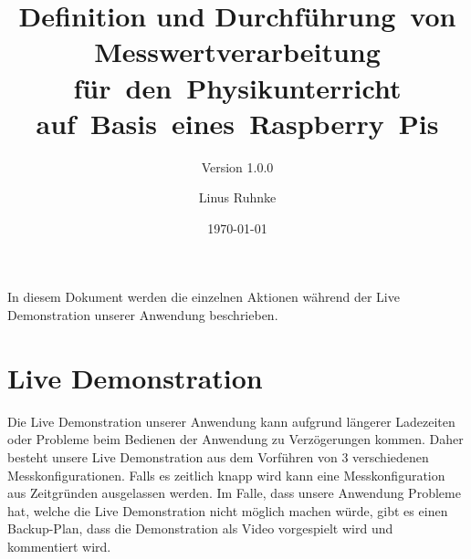 \documentclass[parskip=full]{scrartcl}
\title{Definition und Durchführung~von Messwertverarbeitung für~den~Physikunterricht auf~Basis~eines~Raspberry~Pis}
\subtitle{Version 1.0.0}
\author{Linus Ruhnke}
\date{\today}
\begin{document}
\maketitle


In diesem Dokument werden die einzelnen Aktionen während der Live Demonstration unserer Anwendung beschrieben.

\section{Live Demonstration}

Die Live Demonstration unserer Anwendung kann aufgrund längerer Ladezeiten oder Probleme beim Bedienen der Anwendung zu Verzögerungen kommen. Daher besteht unsere Live Demonstration aus dem Vorführen von 3 verschiedenen Messkonfigurationen. Falls es zeitlich knapp wird kann eine Messkonfiguration aus Zeitgründen ausgelassen werden.
Im Falle, dass unsere Anwendung Probleme hat, welche die Live Demonstration nicht möglich machen würde, gibt es einen Backup-Plan, dass die Demonstration als Video vorgespielt wird und kommentiert wird.
\end{document}
